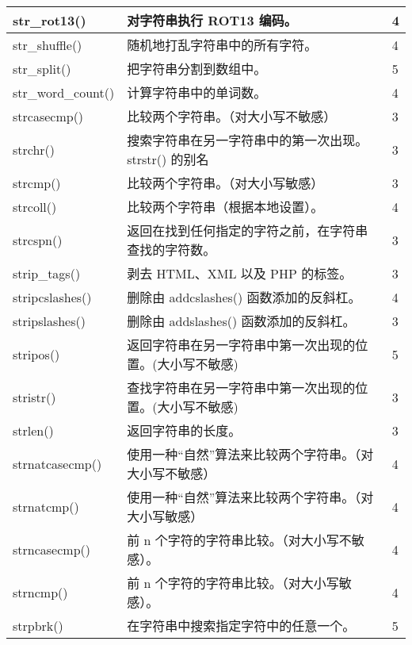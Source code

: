 \begin{longtable}{|m{120pt}|m{250pt}|m{20pt}|}
\hline
str\_rot13()					&对字符串执行 ROT13 编码。	&4\\
\hline
str\_shuffle()				&随机地打乱字符串中的所有字符。&	4\\
\hline
str\_split()					&把字符串分割到数组中。	&5\\
\hline
str\_word\_count()			&计算字符串中的单词数。&	4\\
\hline
strcasecmp()				&比较两个字符串。\newline（对大小写不敏感）&	3\\
\hline
strchr()						&搜索字符串在另一字符串中的第一次出现。\newline strstr() 的别名	&3\\
\hline
strcmp()					&比较两个字符串。\newline（对大小写敏感）	&3\\
\hline
strcoll()						&比较两个字符串（根据本地设置）。	&4\\
\hline
strcspn()					&返回在找到任何指定的字符之前，在字符串查找的字符数。&	3\\
\hline
strip\_tags()					&剥去 HTML、XML 以及 PHP 的标签。	&3\\
\hline
stripcslashes()				&删除由 addcslashes() 函数添加的反斜杠。&	4\\
\hline
stripslashes()				&删除由 addslashes() 函数添加的反斜杠。&	3\\
\hline
stripos()					&返回字符串在另一字符串中第一次出现的位置。\newline (大小写不敏感)	&5\\
\hline
stristr()						&查找字符串在另一字符串中第一次出现的位置。\newline (大小写不敏感)	&3\\
\hline
strlen()						&返回字符串的长度。	&3\\
\hline
strnatcasecmp()				&使用一种“自然”算法来比较两个字符串。\newline（对大小写不敏感）&	4\\
\hline
strnatcmp()					&使用一种“自然”算法来比较两个字符串。\newline（对大小写敏感）	&4\\
\hline
strncasecmp()				&前 n 个字符的字符串比较。\newline（对大小写不敏感）。	&4\\
\hline
strncmp()					&前 n 个字符的字符串比较。\newline（对大小写敏感）。&	4\\
\hline
strpbrk()					&在字符串中搜索指定字符中的任意一个。	&5\\

\end{longtable}
